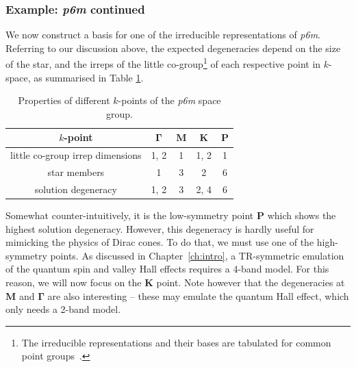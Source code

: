 \subsubsection{Example: \textit{p6m} continued}

We now construct a basis for one of the irreducible representations of \textit{p6m}. Referring to our discussion above, the expected degeneracies depend on the size of the star, and the irreps of the little co-group\footnote{The irreducible representations and their bases are tabulated for common point groups~\cite{Bradley_2009}.} of each respective point in $k$-space, as summarised in Table \ref{table:symm_p6m_degs}.
\begin{table} [h!]
 		\centering
 		\caption{Properties of different $k$-points of the \textit{p6m} space group. }
		\label{table:symm_p6m_degs}
 	\begin{tabular}{ c c c c c }
 		$k$-point & $\boldsymbol{\Gamma}$ & $\boldsymbol{M}$ & $\boldsymbol{K}$ & $\boldsymbol{P}$  \\ \hline
 		little co-group irrep dimensions & 1, 2 & 1 & 1, 2 & 1 \\
 		star members & 1 & 3 & 2 & 6 \\
 		solution degeneracy & 1, 2 & 3 & 2, 4 & 6 \\
 	\end{tabular}
\end{table}

Somewhat counter-intuitively, it is the low-symmetry point $\boldsymbol{P}$ which shows the highest solution degeneracy. However, this degeneracy is hardly useful for mimicking the physics of Dirac cones. To do that, we must use one of the high-symmetry points. As discussed in Chapter~\ref{ch:intro}, a TR-symmetric emulation of the quantum spin and valley Hall effects requires a 4-band model. For this reason, we will now focus on the $\boldsymbol{K}$ point. Note however that the degeneracies at $\boldsymbol{M}$ and $\boldsymbol{\Gamma}$ are also interesting -- these may emulate the quantum Hall effect, which only needs a 2-band model. 

